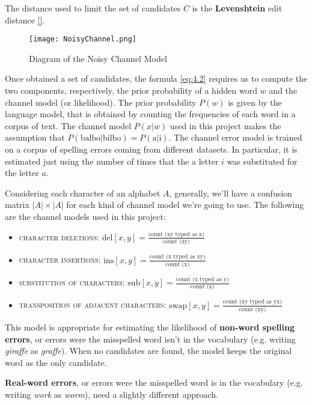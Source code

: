 The distance used to limit the set of candidates $C$ is the \textbf{Levenshtein} edit distance \ref{}.	

\begin{figure}[H]
	\centering
	\texttt{[image: NoisyChannel.png]}
	\caption{Diagram of the Noisy Channel Model}
	\label{fig:noisychannel}
\end{figure}

Once obtained a set of candidates, the formula \ref{eq:4.2} requires us to compute the two components, 
respectively, the prior probability of a hidden word $w$ and the channel model (or likelihood).
The prior probability $P(w)$ is given by the language model, that is obtained by counting the frequencies of 
each word in a corpus of text.  
The channel model $P(x|w)$ used in this project makes the assumption that $P(\mbox{balbo}|\mbox{bilbo}) = 
P(\mbox{a}|\mbox{i})$. The channel error model is trained on a corpus of spelling errors coming from different 
datasets. In particular, it is estimated just using the number of times that the a letter $i$ was substituted for the 
letter $a$. 

Considering each character of an alphabet $A$, generally, we'll have a confusion matrix $|A|\times|A|$ for each 
kind of channel model we're going to use. The following are the channel models used in this project:
\begin{itemize}
	\item \textsc{character deletions}: $\mbox{del}[x, y] = \frac{\mbox{count (xy  typed as x)}} 
	{\mbox{count (xy)}}$
	\item \textsc{character insertions}: $\mbox{ins}[x, y] = \frac{\mbox{count (x  typed as xy)}} 
	{\mbox{count (x)}}$
	\item \textsc{substitution of characters}: $\mbox{sub}[x, y] = \frac{\mbox{count (x  typed as y)}} 
	{\mbox{count (x)}}$
	\item \textsc{transposition of adjacent characters}: $\mbox{swap}[x, y] = \frac{\mbox{count (xy  typed as 
	yx)}} 
	{\mbox{count (xy)}}$
\end{itemize}


This model is appropriate for estimating the likelihood of \textbf{non-word spelling errors}, or errors were the 
misspelled word isn't in the vocabulary (e.g. writing \textsl{giraffe} as \textsl{graffe}).
When no candidates are found, the model keeps the original word as the only candidate.

\textbf{Real-word errors}, or errors were the misspelled word is in the vocabulary (e.g. writing \textsl{work}  as  
\textsl{worm}), need a slightly different approach.


